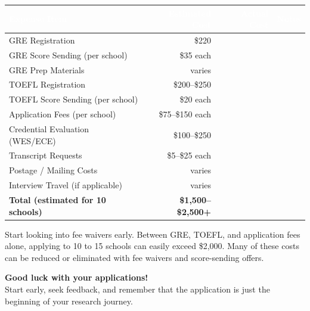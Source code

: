 \documentclass[11pt, letterpaper]{article}
\begin{document}
\vspace{6pt}
\begin{center}
\small
\renewcommand{\arraystretch}{1.5}
\begin{tabular}{>{\raggedright\arraybackslash}p{4.5cm} r r >{\raggedright\arraybackslash}p{3.5cm}}
\toprule
\rowcolor{ctabhead} \textcolor{white}{\textbf{Expense Item}} & \textcolor{white}{\textbf{Estimated Cost}} & \textcolor{white}{\textbf{Actual Cost}} & \textcolor{white}{\textbf{Notes}} \\
\midrule
\rowcolor{gray!8} GRE Registration & \$220 & & \\
GRE Score Sending (per school) & \$35 each & & \\
\rowcolor{gray!8} GRE Prep Materials & varies & & \\
TOEFL Registration & \$200--\$250 & & \\
\rowcolor{gray!8} TOEFL Score Sending (per school) & \$20 each & & \\
Application Fees (per school) & \$75--\$150 each & & \\
\rowcolor{gray!8} Credential Evaluation (WES/ECE) & \$100--\$250 & & \\
Transcript Requests & \$5--\$25 each & & \\
\rowcolor{gray!8} Postage / Mailing Costs & varies & & \\
Interview Travel (if applicable) & varies & & \\
\midrule
\rowcolor{clight} \textbf{Total (estimated for 10 schools)} & \textbf{\$1,500--\$2,500+} & & \\
\bottomrule
\end{tabular}
\end{center}
\vspace{6pt}

\begin{tipbox}
Start looking into fee waivers early. Between GRE, TOEFL, and application fees alone, applying to 10 to 15 schools can easily exceed \$2,000. Many of these costs can be reduced or eliminated with fee waivers and score-sending offers.
\end{tipbox}

\vspace{20pt}

\begin{center}
\colorbox{cmedium}{%
\begin{minipage}[c]{0.85\textwidth}
\vspace{10pt}
\centering
{\large\bfseries\color{cdark} Good luck with your applications!}\\[6pt]
{\normalsize Start early, seek feedback, and remember that the application is just the beginning of your research journey.}
\vspace{10pt}
\end{minipage}%
}
\end{center}
\end{document}
